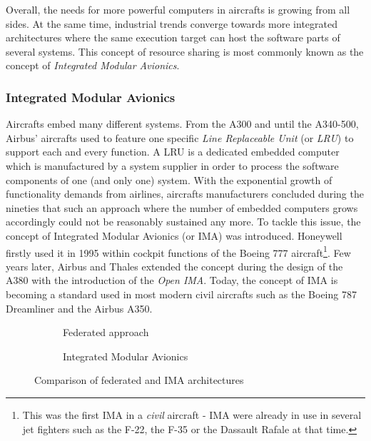 \documentclass[main.tex]{subfiles}
\begin{document}
Overall, the needs for more powerful computers in aircrafts is growing from all
sides. At the same time, industrial trends converge towards more integrated
architectures where the same execution target can host the software parts of
several systems. This concept of resource sharing is most commonly known as the
concept of \emph{Integrated Modular Avionics}.




\subsubsection{Integrated Modular Avionics}
Aircrafts embed many different systems. From the A300 and until the A340-500,
Airbus' aircrafts used to feature one specific \emph{Line Replaceable Unit} (or
\emph{LRU}) to support each and every function. A LRU is a dedicated embedded
computer which is manufactured by a system supplier in order to process the
software components of one (and only one) system. With the exponential growth
of functionality demands from airlines, aircrafts manufacturers concluded
during the nineties that such an approach where the number of embedded
computers grows accordingly could not be reasonably sustained any more. To
tackle this issue, the concept of Integrated Modular Avionics (or IMA) was
introduced. Honeywell firstly used it in 1995 within cockpit functions of the
Boeing 777 aircraft\footnote{This was the first IMA in a \emph{civil} aircraft
- IMA were already in use in several jet fighters such as the F-22, the F-35 or
the Dassault Rafale at that time.}. Few years later, Airbus and Thales extended
the concept during the design of the A380 with the introduction of the
\emph{Open IMA}. Today, the concept of IMA is becoming a standard used in most
modern civil aircrafts such as the Boeing 787 Dreamliner and the Airbus A350. 

\begin{figure}
    \centering

    \begin{subfigure}[b]{0.49\linewidth}
        \scalebox{0.9}{}
        \caption{Federated approach}
        \label{fig_intro_federatedApproach}
    \end{subfigure}
    \begin{subfigure}[b]{0.49\linewidth}
        \centering
        \scalebox{0.9}{}
        \caption{Integrated Modular Avionics}
        \label{fig_intro_IMA}
    \end{subfigure}
    \caption{Comparison of federated and IMA architectures}
    \label{fig_intro_comparisonFederatedVsIMA}
\end{figure}
\end{document}
